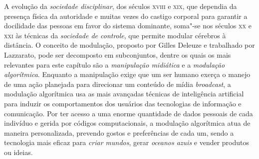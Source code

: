 \noindent{}A evolução da \emph{sociedade disciplinar}, dos séculos \textsc{xviii} e \textsc{xix}, que
dependia da presença física da autoridade e muitas vezes do castigo
corporal para garantir a docilidade das pessoas em favor do sistema
dominante, soma"-se nos séculos \textsc{xx} e \textsc{xxi} às técnicas da \emph{sociedade
de controle}, que permite modular cérebros à distância. O conceito de
modulação, proposto por Gilles Deleuze e trabalhado por Lazzarato, pode
ser decomposto em subconjuntos, dentre os quais os mais relevantes para
este capítulo são a \emph{manipulação midiática} e a \emph{modulação
algorítmica}. Enquanto a manipulação exige que um ser humano exerça o
manejo de uma ação planejada para direcionar um conteúdo de mídia
\emph{broadcast}, a modulação algorítmica usa as mais avançadas técnicas
de inteligência artificial para induzir os comportamentos dos usuários
das tecnologias de informação e comunicação. Por ter acesso a uma enorme
quantidade de dados pessoais de cada indivíduo e gerida por códigos
computacionais, a modulação algorítmica atua de maneira personalizada,
prevendo gostos e preferências de cada um, sendo a tecnologia mais
eficaz para \emph{criar mundos}, gerar \emph{oceanos azuis} e vender
produtos ou ideias.


